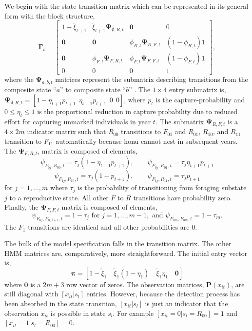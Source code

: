 \documentclass[12pt]{article}
\newcommand{\bP}{\ensuremath{\mathbf{P}}}
\newcommand{\bpi}{\ensuremath{\boldsymbol{\pi}}}
\newcommand{\bG}{\ensuremath{\boldsymbol{\Gamma}}}
\begin{document}
We begin with the state transition matrix which can be represented in its general form with the block structure,
\[
\bG_t = \left[\begin{array}{cccc}
1-\tilde{\xi}_{t+1} & \tilde{\xi}_{t+1}\boldsymbol{\Psi}_{\emptyset,R,t} & \mathbf{0} & 0\\
\mathbf{0} & \mathbf{0} & \phi_{R,t}\boldsymbol{\Psi}_{R,F,t}  & (1-\phi_{R,t})\mathbf{1} \\
\mathbf{0} & \phi_{F,t}\boldsymbol{\Psi}_{F,R,t} &  \phi_{F,t}\boldsymbol{\Psi}_{F,F,t} & (1-\phi_{F,t})\mathbf{1} \\
0 & 0 & 0 & 1
\end{array}
\right],
\] 
where the $\boldsymbol{\Psi}_{a,b,t}$ matrices represent the submatrix describing transitions from the composite state ``$a$'' to composite state ``$b$'' \citep{langrock2011hidden,king2016semi}. The $1\times 4$ entry submatrix is, $\boldsymbol{\Psi}_{\emptyset,R,t} = [1-\eta_{t+1} p_{t+1}\ \ \eta_{t+1} p_{t+1}\ \ 0\ \ 0]$, where $p_t$ is the capture-probability and $0 \le \eta_t \le 1$ is the proportional reduction in capture probability due to reduced effort for capturing unmarked individuals in year $t$. The submatrix $\boldsymbol{\Psi}_{R,F,t}$ is a $4 \times 2m$ indicator matrix such that $R_{00}$ transitions to $F_{01}$ and $R_{01}$, $R_{10}$, and $R_{11}$ transition to $F_{11}$ automatically because honu cannot nest in subsequent years. The $\boldsymbol{\Psi}_{F,R,t}$, matrix is composed of elements,
\[
\psi_{F_{0j},R_{00},t} = \tau_{j}(1-\eta_{t+1}p_{t+1}),\qquad \psi_{F_{0j},R_{01},t} = \tau_j\eta_{t+1} p_{t+1} 
\]
\[
\psi_{F_{1j},R_{10},t} = \tau_j(1-p_{t+1}),\qquad \psi_{F_{1j},R_{11},t} = \tau_j p_{t+1} 
\]
for $j=1,\dots,m$ where $\tau_j$ is the probability of transitioning from foraging substate $j$ to a reproductive state. All other $F$ to $R$ transitions have probability zero. Finally, the $\boldsymbol{\Psi}_{F,F,t}$ matrix is composed of elements,
\[
\psi_{F_{0j},F_{0,j+1},t} = 1-\tau_j \text{ for } j=1,\dots,m-1, \text{ and } \psi_{F_{0m},F_{0m},t} = 1-\tau_{m}.
\]
The $F_1$ transitions are identical and all other probabilities are 0.

The bulk of the model specification falls in the transition matrix. The other HMM matrices are, comparatively, more straightforward. The initial entry vector is,
\[
\bpi = \left[1-\tilde{\xi}_1\quad \tilde{\xi}_1(1-\eta_1) \quad \tilde{\xi}_1\eta_1\quad \mathbf{0}\right]
\]
where $\mathbf{0}$ is a $2m+3$ row vector of zeros. The observation matrices, $\bP(x_{it})$, are still diagonal with $[x_{it}|s_l]$ entries. However, because the detection process has been absorbed in the state transition, $[x_{it}|s_l]$ is just an indicator that the observation $x_{it}$ is possible in state $s_l$. For example $[x_{it}=0|s_l=R_{00}]=1$ and $[x_{it}=1|s_l=R_{00}]=0$. 
\end{document}
